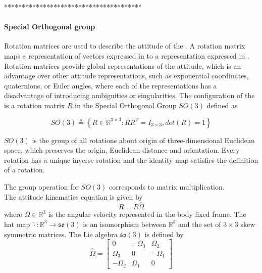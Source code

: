 ***************************************\\

\paragraph{Special Orthogonal group}

Rotation matrices are used to describe the attitude of the . A rotation matrix maps a representation of vectors expressed in \BF to a representation expressed in \IF. 
Rotation matrices provide global representations of the attitude, which is an advantage over other attitude representations, such as exponential coordinates, quaternions, or Euler
angles, where each of the representations has a disadvantage of introducing ambiguities or singularities. The configuration of the  is a rotation matrix $ R $ in the Special Orthogonal Group $ SO(3) $ defined as

\begin{equation}\label{key}
SO(3) \triangleq \left\lbrace R\in\mathbb{R}^{3\times3}:RR^T=I_{3\times3}, det(R)=1\right\rbrace 
\end{equation}

$ SO(3) $ is the group of all rotations about origin of three-dimensional Euclidean space, which preserves the origin, Euclidean distance and orientation.
Every rotation has a unique inverse rotation and the identity map satisfies the definition of a rotation.

The group operation for $ SO(3) $ corresponds to matrix multiplication.\\
The attitude kinematics equation is given by
\begin{equation}\label{key}
\dot{R}=R\hat{\Omega}
\end{equation}
where $ \Omega\in\mathbb{R}^3 $ is the angular velocity represented in the body fixed frame. The hat map $ \hat{\cdot}:\mathbb{R}^3\rightarrow \mathfrak{so}(3)$ is an isomorphism between $ \mathbb{R}^3 $ and the set of $ 3\times 3 $ skew symmetric matrices. The Lie algebra $ \mathfrak{so}(3) $ is defined by
\begin{equation}\label{key}
\hat{\Omega}=\begin{bmatrix}
0&-\Omega_3&\Omega_2\\
\Omega_3&0&-\Omega_1\\
-\Omega_2&\Omega_1&0
\end{bmatrix}
\end{equation}


